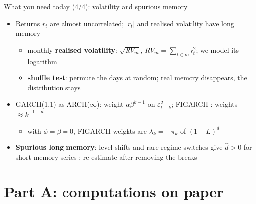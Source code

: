 \begin{frame}{What you need today (4/4): volatility and spurious memory}
\itemsize{\small}
\begin{itemize}
    \item Returns $r_t$ are almost uncorrelated; $|r_t|$ and realised volatility have long memory 
    \begin{itemize}
        \item monthly \textbf{realised volatility}: $\sqrt{RV_m}$, $RV_m = \sum_{t\in m} r_t^2$; we model its logarithm
        \item \textbf{shuffle test}: permute the days at random; real memory disappears, the distribution stays
    \end{itemize}
    \item GARCH(1,1) as ARCH($\infty$): weight $\alpha\beta^{k-1}$ on $\varepsilon_{t-k}^2$; FIGARCH : weights $\approx k^{-1-d}$
    \begin{itemize}
        \item with $\phi = \beta = 0$, FIGARCH weights are $\lambda_k = -\pi_k$ of $(1-L)^d$
    \end{itemize}
    \item \textbf{Spurious long memory}: level shifts and rare regime switches give $\hat d > 0$ for short-memory series ; re-estimate after removing the breaks
\end{itemize}
\end{frame}


\section{Part A: computations on paper}

